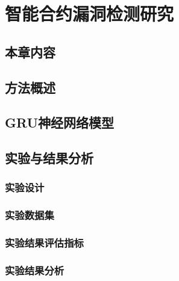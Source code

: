 \chapter{智能合约漏洞检测研究}
\section{本章内容}
\section{方法概述}
\section{GRU神经网络模型}
\section{实验与结果分析}
\subsection{实验设计}
\subsection{实验数据集}
\subsection{实验结果评估指标}
\subsection{实验结果分析}
